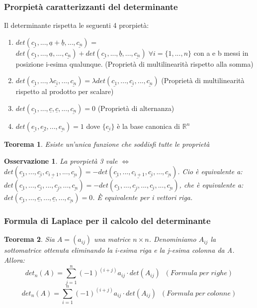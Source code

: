 \documentclass[12pt]{article}
\newenvironment{para}{\begin{adjustwidth}{13mm}{}}{\end{adjustwidth}}
\newtheorem{Teorema}{Teorema}[subsection]
\newtheorem{Osservazione}{Osservazione}[subsection]
\begin{document}
\begin{para}
\subsubsection{Prorpietà caratterizzanti del determinante}
Il determinante rispetta le seguenti 4 prorpietà:
\begin{enumerate}
    \item $det(\underline{c_1}, ..., \underline{a}+\underline{b},...,\underline{c_n})$ = $det(\underline{c_1}, ..., \underline{a},...,\underline{c_n}) + det(\underline{c_1}, ..., \underline{b},...,\underline{c_n}) \; \forall i=\{1,...,n\}$ con a e b messi in posizione i-esima qualunque. (Proprietà di multilinearità rispetto alla somma)
    \item $det(\underline{c_1}, ..., \lambda\underline{c_i}, ..., \underline{c_n}) = \lambda det(\underline{c_1}, ..., \underline{c_i}, ..., \underline{c_n})$ (Proprietà di multilinearità rispetto al prodotto per scalare)
    \item $det(\underline{c_1}, ..., \underline{c}, \underline{c}, ..., \underline{c_n}) = 0$ (Proprietà di alternanza)
    \item $det(\underline{e_1}, \underline{e_2}, ..., \underline{e_n}) = 1$ dove $\{\underline{e_i}\}$ è la base canonica di $\mathbb{R}^n$
\end{enumerate}

\begin{Teorema}
Esiste un'unica funzione che soddisfi tutte le proprietà
\end{Teorema}

\begin{Osservazione}
    La prorpietà 3 vale $\Leftrightarrow$ $det(\underline{c_1}, ..., \underline{c_i}, \underline{c_{i+1}}, ..., \underline{c_n}) = -det(\underline{c_1}, ..., \underline{c_{i+1}},\underline{c_i}, ..., \underline{c_n})$. Cio è equivalente a: $det(\underline{c_1}, ..., \underline{c_i}, ..., \underline{c_{j}}, ..., \underline{c_n}) = -det(\underline{c_1}, ..., \underline{c_j}, ..., \underline{c_{i}}, ..., \underline{c_n})$, che è equivalente a:
$det(\underline{c_1}, ..., \underline{c}, ..., \underline{c}, ..., \underline{c_n}) = 0$. È equivalente per i vettori riga.
\end{Osservazione}
\subsubsection{Formula di Laplace per il calcolo del determinante}
\begin{Teorema}
    Sia $A = (a_{ij})$ una matrice $n \times n$. Denominiamo $A_{ij}$ la sottomatrice ottenuta eliminando la i-esima riga e la j-esima colonna da A. Allora:$$det_n(A)=\sum_{j=1}^n{(-1)^{(i+j)}a_{ij} \cdot det(A_{ij})} \; \; (Formula \; per \; righe)$$
    $$det_n(A)=\sum_{i=1}^n{(-1)^{(i+j)}a_{ij} \cdot det(A_{ij})} \; \; (Formula \; per \; colonne)$$
\end{Teorema}


\end{para}
\end{document}
